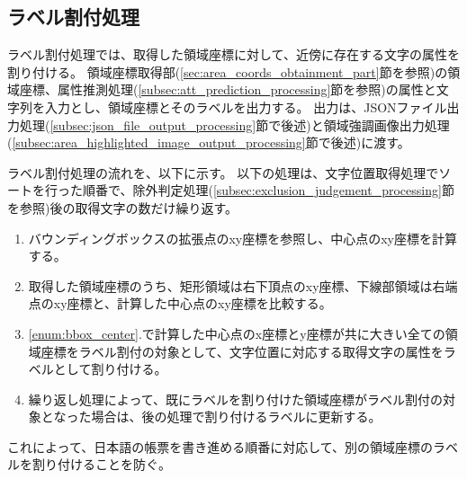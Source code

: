 \subsection{ラベル割付処理}\label{subsec:label_link_processing}
ラベル割付処理では、取得した領域座標に対して、近傍に存在する文字の属性を割り付ける。
領域座標取得部(\ref{sec:area_coords_obtainment_part}節を参照)の領域座標、属性推測処理(\ref{subsec:att_prediction_processing}節を参照)の属性と文字列を入力とし、領域座標とそのラベルを出力する。
出力は、JSONファイル出力処理(\ref{subsec:json_file_output_processing}節で後述)と領域強調画像出力処理(\ref{subsec:area_highlighted_image_output_processing}節で後述)に渡す。

ラベル割付処理の流れを、以下に示す。
以下の処理は、文字位置取得処理でソートを行った順番で、除外判定処理(\ref{subsec:exclusion_judgement_processing}節を参照)後の取得文字の数だけ繰り返す。
\begin{enumerate}
    \item \label{enum:bbox_center} バウンディングボックスの拡張点のxy座標を参照し、中心点のxy座標を計算する。
    \item 取得した領域座標のうち、矩形領域は右下頂点のxy座標、下線部領域は右端点のxy座標と、計算した中心点のxy座標を比較する。
    \item \ref{enum:bbox_center}.で計算した中心点のx座標とy座標が共に大きい全ての領域座標をラベル割付の対象として、文字位置に対応する取得文字の属性をラベルとして割り付ける。
    \item 繰り返し処理によって、既にラベルを割り付けた領域座標がラベル割付の対象となった場合は、後の処理で割り付けるラベルに更新する。
\end{enumerate}
これによって、日本語の帳票を書き進める順番に対応して、別の領域座標のラベルを割り付けることを防ぐ。

